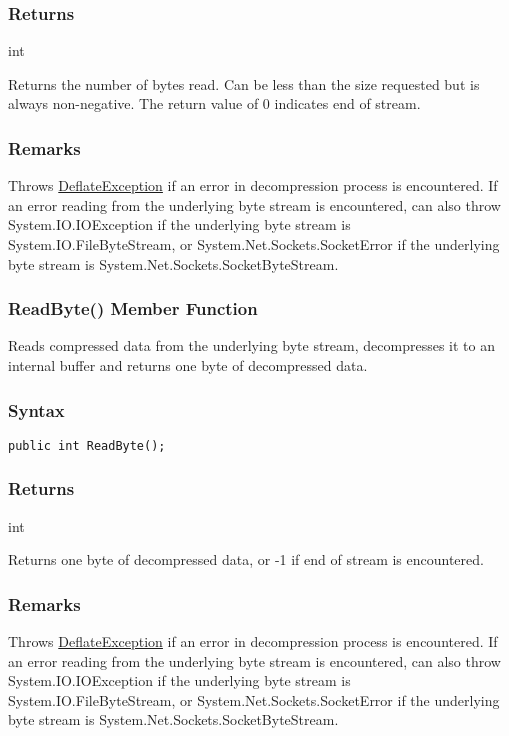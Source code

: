 \documentclass[a4paper,oneside,11.000000pt]{book}
\begin{document}
\subsubsection*{Returns}int
\begin{flushleft}
Returns the number of bytes read. Can be less than the size requested but is always non-negative.
The return value of 0 indicates end of stream.

\end{flushleft}
\subsubsection*{Remarks}
\begin{flushleft}
Throws \hyperlink{System.IO.Compression.DeflateException}{DeflateException} if an error in decompression process is encountered.
If an error reading from the underlying byte stream is encountered, 
can also throw System.\-IO.\-IOException if the underlying byte stream is System.\-IO.\-FileByteStream, or
System.\-Net.\-Sockets.\-SocketError if the underlying byte stream is System.\-Net.\-Sockets.\-SocketByteStream.

\end{flushleft}
\clearpage

\hypertarget{System.IO.Compression.DeflateStream.ReadByte.P.System.IO.Compression.DeflateStream}{\subsubsection*{ReadByte() Member Function}}
\begin{flushleft}
Reads compressed data from the underlying byte stream, decompresses it to an internal buffer 
and returns one byte of decompressed data.

\end{flushleft}
\subsubsection*{Syntax}\texttt{public int ReadByte();}
\subsubsection*{Returns}
int
\begin{flushleft}
Returns one byte of decompressed data, or -1 if end of stream is encountered.

\end{flushleft}
\subsubsection*{Remarks}
\begin{flushleft}
Throws \hyperlink{System.IO.Compression.DeflateException}{DeflateException} if an error in decompression process is encountered.
If an error reading from the underlying byte stream is encountered, 
can also throw System.\-IO.\-IOException if the underlying byte stream is System.\-IO.\-FileByteStream, or
System.\-Net.\-Sockets.\-SocketError if the underlying byte stream is System.\-Net.\-Sockets.\-SocketByteStream.

\end{flushleft}
\clearpage
\end{document}
